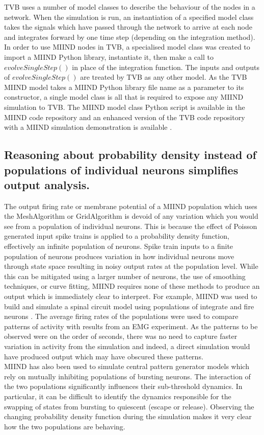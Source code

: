 \documentclass[utf8]{frontiersSCNS} %
\begin{document}
TVB uses a number of model classes to describe the behaviour of the nodes in a network. When the simulation is run, an instantiation of a specified model class takes the signals which have passed through the network to arrive at each node and integrates forward by one time step (depending on the integration method). In order to use MIIND nodes in TVB, a specialised model class was created to import a MIIND Python library, instantiate it, then make a call to $evolveSingleStep()$ in place of the integration function. The inputs and outputs of $evolveSingleStep()$ are treated by TVB as any other model. As the TVB MIIND model takes a MIIND Python library file name as a parameter to its constructor, a single model class is all that is required to expose any MIIND simulation to TVB. The MIIND model class Python script is available in the MIIND code repository and an enhanced version of the TVB code repository with a MIIND simulation demonstration is available \citep{miindwebsitetvb}.\\

\subsection*{Reasoning about probability density instead of populations of individual neurons simplifies output analysis.}
The output firing rate or membrane potential of a MIIND population which uses the MeshAlgorithm or GridAlgorithm is devoid of any variation which you would see from a population of individual neurons. This is because the effect of Poisson generated input spike trains is applied to a probability density function, effectively an infinite population of neurons. Spike train inputs to a finite population of neurons produces variation in how individual neurons move through state space resulting in noisy output rates at the population level. While this can be mitigated using a larger number of neurons, the use of smoothing techniques, or curve fitting, MIIND requires none of these methods to produce an output which is immediately clear to interpret. For example, MIIND was used to build and simulate a spinal circuit model using populations of integrate and fire neurons \citep{york2019muscles}. The average firing rates of the populations were used to compare patterns of activity with results from an EMG experiment. As the patterns to be observed were on the order of seconds, there was no need to capture faster variation in activity from the simulation and indeed, a direct simulation would have produced output which may have obscured these patterns.\\
MIIND has also been used to simulate central pattern generator models which rely on mutually inhibiting populations of bursting neurons. The interaction of the two populations significantly influences their sub-threshold dynamics. In particular, it can be difficult to identify the dynamics responsible for the swapping of states from bursting to quiescent (escape or release). Observing the changing probability density function during the simulation makes it very clear how the two populations are behaving.\\
\end{document}
